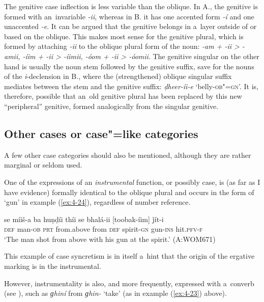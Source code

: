 The genitive case inflection is less variable than the oblique. In A., the genitive is formed with an~invariable \textit{-ii}, whereas in B. it has one accented form \textit{-í} and one unaccented \textit{-e}. It can be argued that the genitive belongs in a~layer outside of or based on the oblique. This makes most sense for the genitive plural, which is formed by attaching \textit{-ii} to the oblique plural form of the noun: \textit{-am + -ii {\textgreater} -amii, -íim + -ii {\textgreater} -íimii, -óom + -ii {\textgreater} -óomii}. The genitive singular on the other hand is usually the noun stem followed by the genitive suffix, save for the nouns of the \textit{i}-declension in B., where the (strengthened) oblique singular suffix mediates between the stem and the genitive suffix: \textit{ḍheer-íi-e} `belly-\textsc{ob"=gn}'. It is, therefore, possible that an~old genitive plural has been replaced by this new ``peripheral'' genitive, formed analogically from the singular genitive.

\subsection{Other cases or case"=like categories}
\label{subsec:4-5-4}

A few other case categories should also be mentioned, although they are rather marginal or seldom used. 


One of the expressions of an \textit{instrumental} function, or possibly case, is (as far as I have evidence) formally identical to the oblique plural and occurs in the form of `gun' in example (\ref{ex:4-24}), regardless of number reference. 


\begin{exe}
\ex
\label{ex:4-24}
\gll se míiš-a ba huṇḍíi thíi se bhalá-ii [toobak-íim] ǰít-i \\
	\textsc{def} man-\textsc{ob} \textsc{prt} from.above from \textsc{def} spirit-\textsc{gn} gun-\textsc{ins} hit.\textsc{pfv-f}\\
\glt `The man shot from above with his gun at the spirit.' (A:WOM671)
\end{exe}

This example of case syncretism is in itself a~hint that the origin of the ergative marking is in the instrumental. 


However, instrumentality is also, and more frequently, expressed with a~converb (see ), such as \textit{ɡhiní} from \textit{ɡhin-} `take' (as in example (\ref{ex:4-23}) above).


